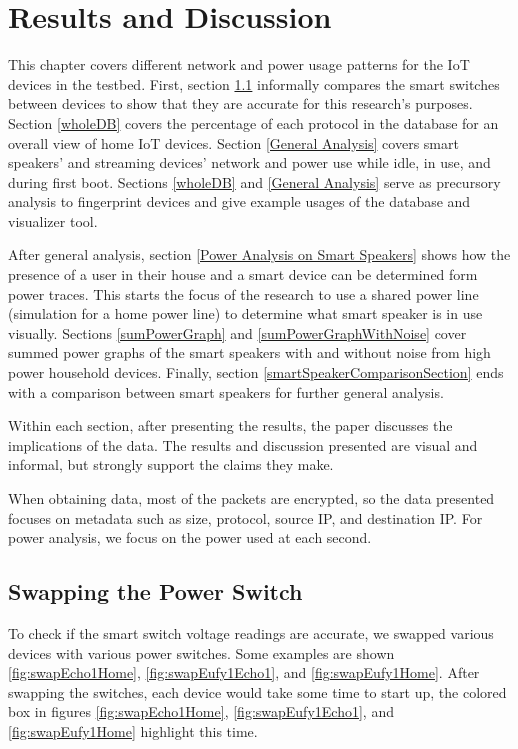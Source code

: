 \chapter{Results and Discussion}
\label{Results}
This chapter covers different network and power usage patterns for the IoT devices in the testbed. First, section \ref{swappingSwitch} informally compares the smart switches between devices to show that they are accurate for this research's purposes. Section \ref{wholeDB} covers the percentage of each protocol in the database for an overall view of home IoT devices. Section \ref{General Analysis} covers smart speakers' and streaming devices' network and power use while idle, in use, and during first boot. Sections \ref{wholeDB} and \ref{General Analysis} serve as precursory analysis to fingerprint devices and give example usages of the database and visualizer tool.

After general analysis, section \ref{Power Analysis on Smart Speakers} shows how the presence of a user in their house and a smart device can be determined form power traces. This starts the focus of the research to use a shared power line (simulation for a home power line) to determine what smart speaker is in use visually. Sections \ref{sumPowerGraph} and \ref{sumPowerGraphWithNoise} cover summed power graphs of the smart speakers with and without noise from high power household devices. Finally, section \ref{smartSpeakerComparisonSection} ends with a comparison between smart speakers for further general analysis.

Within each section, after presenting the results, the paper discusses the implications of the data. The results and discussion presented are visual and informal, but strongly support the claims they make.

When obtaining data, most of the packets are encrypted, so the data presented focuses on metadata such as size, protocol, source IP, and destination IP. For power analysis, we focus on the power used at each second.

\section{Swapping the Power Switch}
\label{swappingSwitch}
To check if the smart switch voltage readings are accurate, we swapped various devices with various power switches. Some examples are shown \ref{fig:swapEcho1Home}, \ref{fig:swapEufy1Echo1}, and \ref{fig:swapEufy1Home}. After swapping the switches, each device would take some time to start up,  the colored box in figures \ref{fig:swapEcho1Home}, \ref{fig:swapEufy1Echo1}, and \ref{fig:swapEufy1Home} highlight this time.

